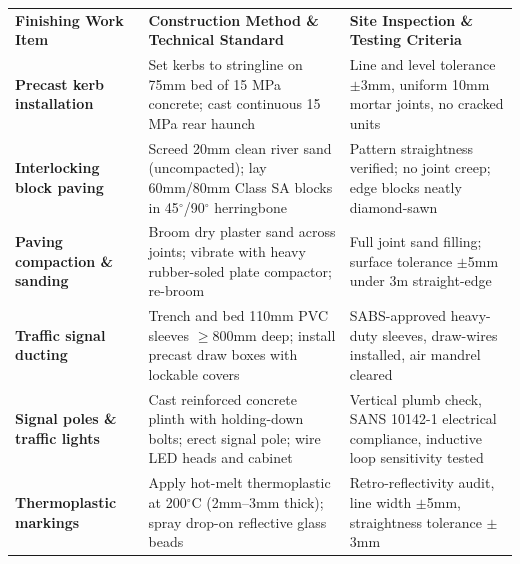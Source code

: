 {\fontsize{7.7pt}{9.8pt}\selectfont
\renewcommand{\arraystretch}{1.23}
\noindent
\begin{tabularx}{\textwidth}{@{}p{3.3cm} p{6.6cm} X@{}}
\rowcolor{mhnavy}
{\color{white}\bfseries Finishing Work Item} & {\color{white}\bfseries Construction Method \& Technical Standard} & {\color{white}\bfseries Site Inspection \& Testing Criteria} \\
\rowcolor{mhbluelight}
\bfseries Precast kerb installation & Set kerbs to stringline on 75mm bed of 15 MPa concrete; cast continuous 15 MPa rear haunch & Line and level tolerance $\pm$3mm, uniform 10mm mortar joints, no cracked units \\
\bfseries Interlocking block paving & Screed 20mm clean river sand (uncompacted); lay 60mm/80mm Class SA blocks in 45$^\circ$/90$^\circ$ herringbone & Pattern straightness verified; no joint creep; edge blocks neatly diamond-sawn \\
\rowcolor{mhbluelight}
\bfseries Paving compaction \& sanding & Broom dry plaster sand across joints; vibrate with heavy rubber-soled plate compactor; re-broom & Full joint sand filling; surface tolerance $\pm$5mm under 3m straight-edge \\
\bfseries Traffic signal ducting & Trench and bed 110mm PVC sleeves $\ge$800mm deep; install precast draw boxes with lockable covers & SABS-approved heavy-duty sleeves, draw-wires installed, air mandrel cleared \\
\rowcolor{mhbluelight}
\bfseries Signal poles \& traffic lights & Cast reinforced concrete plinth with holding-down bolts; erect signal pole; wire LED heads and cabinet & Vertical plumb check, SANS 10142-1 electrical compliance, inductive loop sensitivity tested \\
\bfseries Thermoplastic markings & Apply hot-melt thermoplastic at 200$^\circ$C (2mm--3mm thick); spray drop-on reflective glass beads & Retro-reflectivity audit, line width $\pm$5mm, straightness tolerance $\pm$3mm \\
\end{tabularx}
\renewcommand{\arraystretch}{1}
}

\vfill

